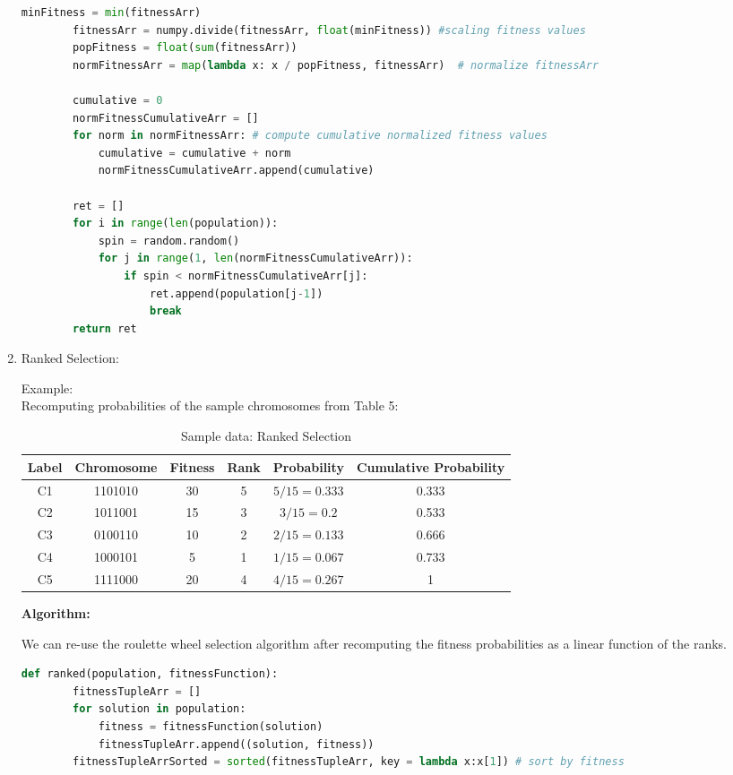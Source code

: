 \documentclass[12pt,a4paper]{article}
\begin{document}
\begin{enumerate}
\begin{lstlisting}[language=Python]
        minFitness = min(fitnessArr)
        fitnessArr = numpy.divide(fitnessArr, float(minFitness)) #scaling fitness values
        popFitness = float(sum(fitnessArr))   
        normFitnessArr = map(lambda x: x / popFitness, fitnessArr)  # normalize fitnessArr
        
        cumulative = 0
        normFitnessCumulativeArr = []
        for norm in normFitnessArr: # compute cumulative normalized fitness values
            cumulative = cumulative + norm
            normFitnessCumulativeArr.append(cumulative)
        
        ret = []
        for i in range(len(population)):
            spin = random.random()
            for j in range(1, len(normFitnessCumulativeArr)):
                if spin < normFitnessCumulativeArr[j]:
                    ret.append(population[j-1])
                    break
        return ret    
	\end{lstlisting}

	\item Ranked Selection: \par
	Example: \\
	Recomputing probabilities of the sample chromosomes from Table 5:
	\begin{table}[H]
		\centering
		\caption{Sample data: Ranked Selection}
		\begin{tabular}{ |c|c|c|c|c|c| }
			\hline
			Label & Chromosome & Fitness & Rank & Probability & Cumulative Probability \\
			\hline
			\hline
			C1 & 1101010 & 30 & 5 & $5/15=0.333$ & 0.333 \\
			\hline
			C2 & 1011001 & 15 & 3 & $3/15=0.2$ & 0.533 \\
			\hline
			C3 & 0100110 & 10 & 2 & $2/15=0.133$ & 0.666 \\
			\hline
			C4 & 1000101 & 5 & 1 & $1/15=0.067$ & 0.733 \\
			\hline
			C5 & 1111000 & 20 & 4 & $4/15=0.267$ & 1 \\
			\hline
		\end{tabular}
	\end{table}	
	
	\textbf{Algorithm:} \par
	We can re-use the roulette wheel selection algorithm after recomputing the fitness probabilities as a linear function of the ranks.
	\vspace{5mm}
	\begin{lstlisting}[language=Python]
    def ranked(population, fitnessFunction):
        fitnessTupleArr = []
        for solution in population:
            fitness = fitnessFunction(solution)
            fitnessTupleArr.append((solution, fitness))
        fitnessTupleArrSorted = sorted(fitnessTupleArr, key = lambda x:x[1]) # sort by fitness
    

\end{lstlisting}
\end{enumerate}
\end{document}
